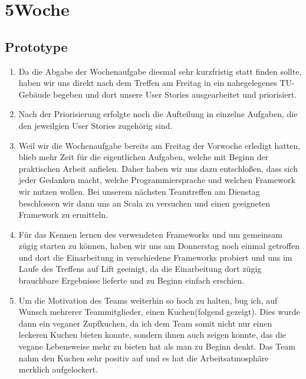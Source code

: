 \chapter{5\hspace{0.5em}Woche}\label{wo5}

\section{Prototype}\label{wo5_1}

\begin{enumerate}[label={\Roman*)}]
	\item Da die Abgabe der Wochenaufgabe diesmal sehr kurzfristig statt finden sollte, haben wir uns direkt nach dem Treffen
am Freitag in ein nahegelegenes TU-Geb\"aude begeben und dort unsere User Stories ausgearbeitet und priorisiert.
	\item Nach der Priorisierung erfolgte noch die Aufteilung in einzelne Aufgaben, die den jeweilgien User Stories
zugeh\"orig sind.
	\item Weil wir die Wochenaufgabe bereits am Freitag der Vorwoche erledigt hatten, blieb mehr Zeit f\"ur die eigentlichen
Aufgaben, welche mit Beginn der praktischen Arbeit anfielen. Daher haben wir uns dazu entschlo\ss{}en, dass sich jeder Gedanken
macht, welche Programmiersprache und welchen Framework wir nutzen wollen. Bei unserem n\"achsten Teamtreffen am Dienstag
beschlossen wir dann uns an Scala zu versuchen und einen geeigneten Framework zu ermitteln.
	\item F\"ur das Kennen lernen des verwendeten Frameworks und um gemeinsam z\"ugig starten zu
k\"onnen, haben wir uns am Donnerstag noch einmal getroffen und dort die Einarbeitung in verschiedene Frameworks probiert und uns
im Laufe des Treffens auf Lift geeinigt, da die Einarbeitung dort z\"ugig brauchbare Ergebnisse lieferte und zu Beginn einfach
erschien.
	\item Um die Motivation des Teams weiterhin so hoch zu halten, bug ich, auf Wunsch mehrerer Teammitglieder, einen
Kuchen(folgend gezeigt). Dies wurde dann ein veganer Zupfkuchen, da ich dem Team somit nicht nur einen leckeren Kuchen bieten
konnte, sondern ihnen auch zeigen konnte, das die vegane Lebensweise mehr zu bieten hat als man zu Beginn denkt. Das Team nahm den
Kuchen sehr positiv auf und es hat die Arbeitsatmosph\"are merklich aufgelockert.
\begin{center}

\end{center}
\end{enumerate}
